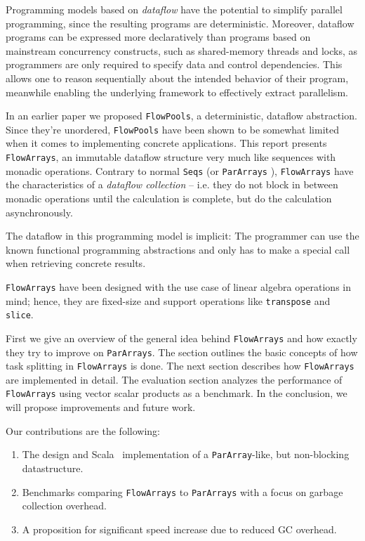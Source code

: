 \documentclass[runningheads,a4paper,fleqn]{llncs}
\begin{document}
Programming models based on \emph{dataflow} \cite{Arvind89,CnC10} have the
potential to simplify parallel programming, since the resulting programs are
deterministic. Moreover, dataflow programs can be expressed more declaratively
than programs based on mainstream concurrency constructs, such as shared-memory 
threads and locks, as programmers are only required to specify data and
control dependencies. This allows one to reason sequentially about the
intended behavior of their program, meanwhile enabling the underlying
framework to effectively extract parallelism.

In an earlier paper \cite{FP12} we proposed \texttt{FlowPools}, a
deterministic, dataflow abstraction. Since they're unordered,
\texttt{FlowPools} have been
shown to be somewhat limited when it comes to implementing concrete
applications. This report presents \texttt{FlowArrays}, an immutable
dataflow structure very much like sequences with monadic
operations. Contrary to normal \texttt{Seqs} (or \texttt{ParArrays}
\cite{collect11}), \texttt{FlowArrays} have the characteristics of a
\emph{dataflow collection} -- i.e. they do not block in between
monadic operations until the calculation is complete, but do the
calculation asynchronously.

The dataflow in this programming model is implicit: The programmer can
use the known functional programming abstractions and only has to
make a special call when retrieving concrete results.

\texttt{FlowArrays} have been designed with the use case of linear
algebra operations in mind; hence, they are fixed-size and support
operations like \texttt{transpose} and \texttt{slice}.

First we give an overview of the general idea behind \texttt{FlowArrays} and
how exactly they try to improve on \texttt{ParArrays}. The section outlines the
basic concepts of how task splitting in \texttt{FlowArrays} is done. The next
section describes how \texttt{FlowArrays} are implemented in detail. The
evaluation section analyzes the performance of \texttt{FlowArrays} using vector
scalar products as a benchmark. In the conclusion, we will propose
improvements and future work.

Our contributions are the following:
\begin{enumerate}
\item The design and Scala~\cite{Odersky10} implementation of a
  \texttt{ParArray}-like, but non-blocking datastructure.
\item Benchmarks comparing \texttt{FlowArrays} to \texttt{ParArrays} with a focus on
  garbage collection overhead.
\item A proposition for significant speed increase due to reduced GC
  overhead.
\end{enumerate}
\end{document}
